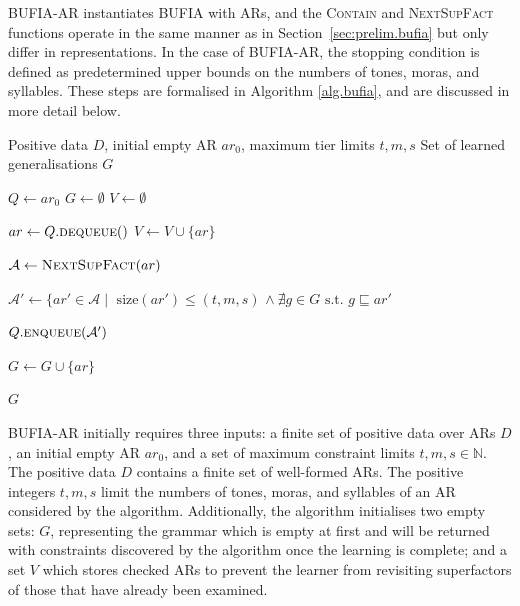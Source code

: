 \documentclass{CUP-JNL-PHO}%
\theoremstyle{definition}
\numberwithin{equation}{section}
\theoremstyle{definition}
\begin{document}
BUFIA-AR instantiates BUFIA with ARs, and the \textsc{Contain} and
\textsc{NextSupFact} functions operate in the same manner as in
Section~\ref{sec:prelim.bufia} but only differ in representations.  In
the case of BUFIA-AR, the stopping condition is defined as
predetermined upper bounds on the numbers of tones, moras, and
syllables. These steps are formalised in Algorithm \ref{alg.bufia},
and are discussed in more detail below.  

\begin{algorithm}
	\caption{\textsc{Bottom-Up Factorial Inference Algorithm over Autosegmental Representations}}
	\label{alg.bufia}
	\begin{algorithmic}[1]
		\Require Positive data $D$, initial empty AR $ar_0$, maximum tier limits $t, m, s$
		\Ensure Set of learned generalisations $G$
		
		\State $Q \gets {ar_0}$ %
		\State $G \gets \emptyset$ %
		\State $V \gets \emptyset$ %
		
		\State $ar \gets Q.\textsc{dequeue}()$ \label{dequeue}
		\State $V \gets V \cup \{ar\}$
		
		\State $\mathcal{A} \gets \textsc{NextSupFact}(ar)$
		
		\State $\mathcal{A}' \gets \{ ar' \in \mathcal{A} \mid$
  		$\text{size}(ar') \le (t, m, s)$
		$\land\ \nexists g \in G \text{ s.t. } g \sqsubseteq ar'$
		
		\State $Q.\textsc{enqueue}(\mathcal{A}')$ \label{enqueue}

		\Else
		\State $G \gets G \cup \{ar\}$
		\EndIf
		\EndIf
		\EndWhile
	
		\State \Return $G$
	\end{algorithmic}
\end{algorithm}


BUFIA-AR initially requires three inputs: a finite set of positive data
over ARs $D$, an initial empty AR \(ar_0\), and a set of maximum constraint 
limits \(t, m, s \in\mathbb{N}\). The positive data \( D \) contains 
a finite set of well-formed ARs. The positive integers \(t, m, s\) 
limit the numbers of tones, moras, and syllables of an AR considered by the algorithm. 
Additionally, the algorithm initialises two empty sets: \( G \), representing the 
grammar which is empty at first and will be returned with constraints 
discovered by the algorithm once the learning is complete; and a set \( 
V \) which stores checked ARs to prevent the learner from revisiting
superfactors of those that have already been examined.
\end{document}
